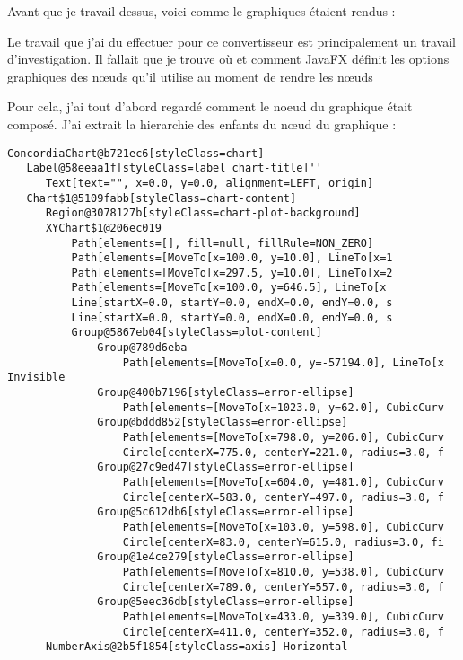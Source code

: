 Avant que je travail dessus, voici comme le graphiques étaient rendus :

Le travail que j'ai du effectuer pour ce convertisseur est principalement un travail d'investigation. Il fallait que je trouve où et comment JavaFX définit les options graphiques des nœuds qu'il utilise au moment de rendre les nœuds 

Pour cela, j'ai tout d'abord regardé comment le noeud du graphique était composé. J'ai extrait la hierarchie des enfants du nœud du graphique :

\begin{verbatim}
ConcordiaChart@b721ec6[styleClass=chart]
   Label@58eeaa1f[styleClass=label chart-title]''
      Text[text="", x=0.0, y=0.0, alignment=LEFT, origin]
   Chart$1@5109fabb[styleClass=chart-content]
      Region@3078127b[styleClass=chart-plot-background]
      XYChart$1@206ec019
          Path[elements=[], fill=null, fillRule=NON_ZERO]
          Path[elements=[MoveTo[x=100.0, y=10.0], LineTo[x=1 
          Path[elements=[MoveTo[x=297.5, y=10.0], LineTo[x=2
          Path[elements=[MoveTo[x=100.0, y=646.5], LineTo[x 
          Line[startX=0.0, startY=0.0, endX=0.0, endY=0.0, s 
          Line[startX=0.0, startY=0.0, endX=0.0, endY=0.0, s
          Group@5867eb04[styleClass=plot-content]
              Group@789d6eba
                  Path[elements=[MoveTo[x=0.0, y=-57194.0], LineTo[x Invisible
              Group@400b7196[styleClass=error-ellipse]
                  Path[elements=[MoveTo[x=1023.0, y=62.0], CubicCurv
              Group@bddd852[styleClass=error-ellipse]
                  Path[elements=[MoveTo[x=798.0, y=206.0], CubicCurv
                  Circle[centerX=775.0, centerY=221.0, radius=3.0, f
              Group@27c9ed47[styleClass=error-ellipse]
                  Path[elements=[MoveTo[x=604.0, y=481.0], CubicCurv
                  Circle[centerX=583.0, centerY=497.0, radius=3.0, f
              Group@5c612db6[styleClass=error-ellipse]
                  Path[elements=[MoveTo[x=103.0, y=598.0], CubicCurv
                  Circle[centerX=83.0, centerY=615.0, radius=3.0, fi
              Group@1e4ce279[styleClass=error-ellipse]
                  Path[elements=[MoveTo[x=810.0, y=538.0], CubicCurv
                  Circle[centerX=789.0, centerY=557.0, radius=3.0, f
              Group@5eec36db[styleClass=error-ellipse]
                  Path[elements=[MoveTo[x=433.0, y=339.0], CubicCurv
                  Circle[centerX=411.0, centerY=352.0, radius=3.0, f
      NumberAxis@2b5f1854[styleClass=axis] Horizontal 

\end{verbatim}
